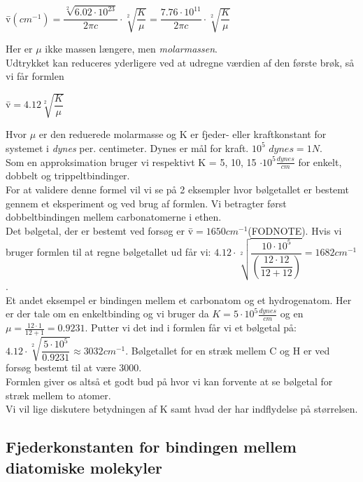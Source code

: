 \begin{center}
\={v}$(cm^{-1})=\dfrac{\sqrt[2]{6.02 \cdot 10^{23}}}{2 \pi c} \cdot \sqrt[2]{\dfrac{K}{\mu}} = \dfrac{7.76 \cdot 10^{11}}{2 \pi c} \cdot \sqrt[2]{\dfrac{K}{\mu}}$
\end{center}

Her er $\mu$ ikke massen længere, men \emph{molarmassen}.
\\
Udtrykket kan reduceres yderligere ved at udregne værdien af den  første brøk, så vi får formlen

\begin{center}
\={v}$=4.12 \sqrt[2]{\dfrac{K}{\mu}}$
\end{center}

Hvor $\mu$ er den reduerede molarmasse og K er fjeder- eller kraftkonstant for systemet i \emph{dynes} per. centimeter. Dynes er mål for kraft. $10^5$  $dynes = 1N$.
\\
Som en approksimation bruger vi respektivt K = 5, 10, 15 $\cdot 10^5 \frac{dynes}{cm}$ for enkelt, dobbelt og trippeltbindinger.
\\
For at validere denne formel vil vi se på 2 eksempler hvor bølgetallet er bestemt gennem et eksperiment og ved brug af formlen. Vi betragter først dobbeltbindingen mellem carbonatomerne i ethen.
\\
Det bølgetal, der er bestemt ved forsøg er \={v}$=1650cm^{-1}$(FODNOTE). Hvis vi bruger formlen til at regne bølgetallet ud får vi: $4.12 \cdot \sqrt[2]{\dfrac{10 \cdot 10^5}{(\dfrac{12 \cdot 12}{12 +12})}} = 1682 cm^{-1}$. 
\\
Et andet eksempel er bindingen mellem et carbonatom og et hydrogenatom. Her er der tale om en enkeltbinding og vi bruger da $K=5 \cdot 10^5 \frac{dynes}{cm}$ og en $\mu = \frac{12 \cdot 1}{12 + 1} = 0.9231$. Putter vi det ind i formlen får vi et bølgetal på: $4.12 \cdot \sqrt[2]{\dfrac{5 \cdot 10^5}{0.9231}} \approx 3032 cm^{-1}$. Bølgetallet for en stræk mellem C og H er ved forsøg bestemt til at være 3000. 
\\
Formlen giver os altså et godt bud på hvor vi kan forvente at se bølgetal for stræk mellem to atomer.
\\
Vi vil lige diskutere betydningen af K samt hvad der har indflydelse på størrelsen. 
\subsection{Fjederkonstanten for bindingen mellem diatomiske molekyler}

